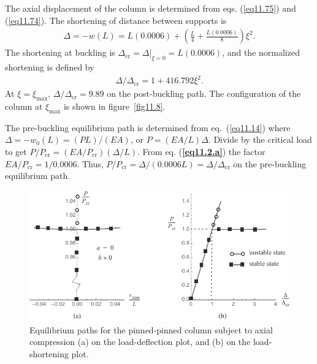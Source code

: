 \documentclass{AeroStructure-ERJohnson}
\begin{document}
\begin{example}
The axial displacement of the column is determined from eqs. (\ref{eq11.75}) and (\ref{eq11.74}). The shortening of distance between supports is
\begin{align}
\Delta=-w(L)=L(0.0006)+\left(\frac{L}{4}+\frac{L(0.0006)}{8}\right) \xi^{2}. \label{eq11.2.h}\tag{h}
\end{align}
The shortening at buckling is $\Delta_{\mathrm{cr}}=\left.\Delta\right|_{\xi=0}=L(0.0006)$, and the normalized shortening is defined by
\begin{align}
\Delta/\Delta_{\mathrm{cr}}=1+416.792 \xi^{2}. \label{eq11.2.i}\tag{i}
\end{align}
At $\xi=\xi_{\max }$, $\Delta/\Delta_{\mathrm{cr}}=9.89$ on the post-buckling path. The configuration of the column at $\xi_{\max }$ is shown in figure~\ref{fig11.8}.


The pre-buckling equilibrium path is determined from eq.~(\ref{eq11.14}) where $\Delta=-w_{0}(L)=(P L) /(E A)$, or ${P=(E A/ L) \Delta}$. Divide by the critical load to get $P/P_{\mathrm{cr}}=\left(E A/P_{\mathrm{cr}}\right)(\Delta/L)$. From eq. (\textbf{\ref{eq11.2.a}}) the factor $E A/P_{\mathrm{cr}}=1/0.0006$. Thus, $P/P_{\mathrm{cr}}=\Delta /(0.0006 L)=\Delta/ \Delta_{\mathrm{cr}}$ on the pre-buckling equilibrium path.

\begin{figure}[!h]
\centerline{\includegraphics{Figure_11-9.pdf}}
\caption{Equilibrium paths for the pinned-pinned column subject to axial compression (a) on the load-deflection plot, and (b) on the load-shortening plot.} \label{fig11.9}
\end{figure}


\end{example}
\end{document}
